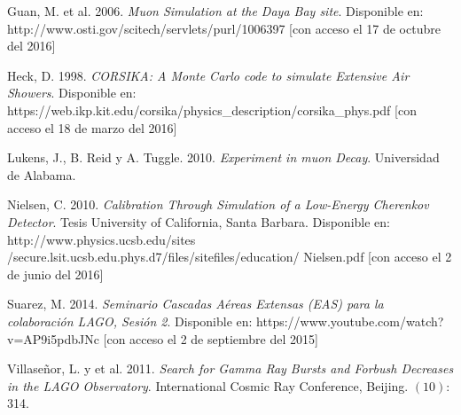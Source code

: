 \documentclass{book}
\begin{document}
\begin{thebibliography}{9}
 Guan, M. et al. 2006.  \textit{Muon Simulation at the Daya Bay site}. Disponible en: \\http://www.osti.gov/scitech/servlets/purl/1006397 [con acceso el 17 de octubre del 2016]

 Heck, D. 1998. \textit{CORSIKA: A Monte Carlo code to simulate Extensive Air Showers}. Disponible en: https://web.ikp.kit.edu/corsika/physics\_description/corsika\_phys.pdf [con acceso el 18 de marzo del 2016]

 Lukens, J., B. Reid y A. Tuggle.  2010. \textit{Experiment in muon Decay}. Universidad de Alabama.

 Nielsen, C.  2010. \textit{Calibration Through Simulation of a Low-Energy Cherenkov Detector}. Tesis University of California, Santa Barbara. Disponible en: http://www.physics.ucsb.edu/sites\\/secure.lsit.ucsb.edu.phys.d7/files/sitefiles/education/ Nielsen.pdf [con acceso el 2 de junio del 2016]

 Suarez, M. 2014. \textit{Seminario Cascadas A\'ereas Extensas (EAS) para la colaboraci\'on LAGO, Sesi\'on 2}. Disponible en: https://www.youtube.com/watch?v=AP9i5pdbJNc [con acceso el 2 de septiembre del 2015]

 Villase\~nor, L. y et al. 2011. \textit{Search for Gamma Ray Bursts and Forbush Decreases in the LAGO Observatory}. International Cosmic Ray Conference, Beijing. $(10)$: 314.


\end{thebibliography}




\end{document}

